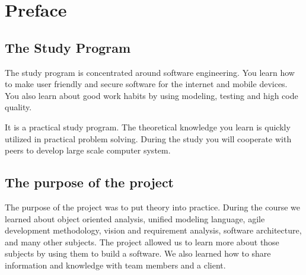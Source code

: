 \section{Preface}
\subsection{The Study Program}
The study program is concentrated around software engineering. You learn how to make user friendly and secure software for the internet and mobile devices. You also learn about good work habits by using modeling, testing and high code quality.

It is a practical study program. The theoretical knowledge you learn is quickly utilized in practical problem solving. During the study you will cooperate with peers to develop large scale computer system.

\subsection{The purpose of the project}
The purpose of the project was to put theory into practice. During the course we learned about object oriented analysis, unified modeling language, agile development methodology, vision and requirement analysis, software architecture, and many other subjects. The project allowed us to learn more about those subjects by using them to build a software. We also learned how to share information and knowledge with team members and a client.
